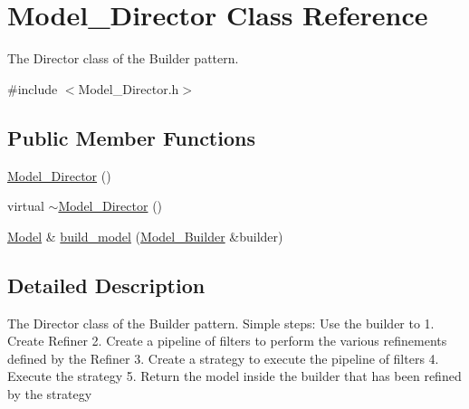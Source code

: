 \hypertarget{class_model___director}{
\section{Model\_\-Director Class Reference}
\label{class_model___director}
}


The Director class of the Builder pattern.  




{\ttfamily \#include $<$Model\_\-Director.h$>$}

\subsection*{Public Member Functions}
\begin{DoxyCompactItemize}
\item 
\hyperlink{class_model___director_a97b0e71e984372fa577d38d65dedebfe}{Model\_\-Director} ()
\item 
virtual \hyperlink{class_model___director_a1d83f666e4d4a8072946fe7fd9c2b504}{$\sim$Model\_\-Director} ()
\item 
\hyperlink{class_model}{Model} \& \hyperlink{class_model___director_a79c6b243e12ebf4bd8da65b468fbbf08}{build\_\-model} (\hyperlink{class_model___builder}{Model\_\-Builder} \&builder)
\end{DoxyCompactItemize}


\subsection{Detailed Description}
The Director class of the Builder pattern. Simple steps: Use the builder to 1. Create Refiner 2. Create a pipeline of filters to perform the various refinements defined by the Refiner 3. Create a strategy to execute the pipeline of filters 4. Execute the strategy 5. Return the model inside the builder that has been refined by the strategy 

